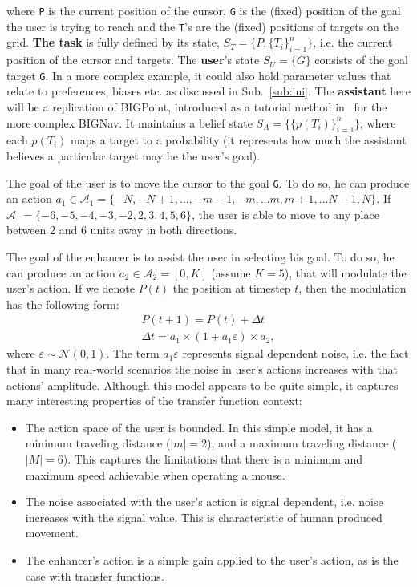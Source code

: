 \documentclass[12pt,a4paper]{article}
\begin{document}
\noindent where \texttt{P} is the current position of the cursor, \texttt{G} is the (fixed) position of the goal the user is trying to reach and the \texttt{T}'s are the (fixed) positions of targets on the grid.
\textbf{The task} is fully defined by its state, $S_T = \lbrace P, \lbrace T_i \rbrace_{i=1}^n \rbrace$, i.e. the current position of the cursor and targets. The \textbf{user}'s state $S_U = \lbrace G \rbrace$ consists of the goal target \texttt{G}. In a more complex example, it could also hold parameter values that relate to preferences, biases etc. as discussed in Sub.~\ref{sub:iui}. The \textbf{assistant} here will be a replication of BIGPoint, introduced as a tutorial method in~\cite{lui2017} for the more complex BIGNav. It maintains a belief state $S_A = \lbrace \lbrace p(T_i) \rbrace_{i=1}^n \rbrace$, where each $p(T_i)$ maps a target to a probability (it represents how much the assistant believes a particular target may be the user's goal).





The goal of the user is to move the cursor to the goal \texttt{G}. To do so, he can produce an action $a_1 \in \mathcal{A}_1 =  \lbrace -N, -N +1, \dots{}, -m -1, -m, \dots{} m, m+1, \dots{} N-1, N \rbrace$. If $\mathcal{A}_1 = \lbrace-6, -5, -4, -3, -2, 2, 3, 4, 5, 6 \rbrace$, the user is able to move to any place between 2 and 6 units away in both directions. 


The goal of the enhancer is to assist the user in selecting his goal. To do so, he can produce an action $a_2 \in \mathcal{A}_2 = [0,K]$ (assume $K=5$), that will modulate the user's action. If we denote $P(t)$ the position at timestep $t$, then the modulation has the following form:
\begin{align}
P(t+1) = P(t) + \Delta t \label{eq:toy_problem_model_1} \\
\Delta t =  a_1 \times (1 + a_1 \varepsilon) \times a_2, \label{eq:toy_problem_model_2}
\end{align}
\noindent where $\varepsilon \sim  \mathcal{N}(0,1)$. The term $a_1 \varepsilon$ represents signal dependent noise, i.e. the fact that in many real-world scenarios the noise in user's actions increases with that actions' amplitude.
Although this model appears to be quite simple, it captures many interesting properties of the transfer function context:

\begin{itemize}
\item The action space of the user is bounded. In this simple model, it has a minimum traveling distance ($|m|=2$), and a maximum traveling distance ($|M| = 6$). This captures the limitations that there is a minimum and maximum speed achievable when operating a mouse.
\item The noise associated with the user's action is signal dependent, i.e. noise increases with the signal value. This is characteristic of human produced movement.
\item The enhancer's action is a simple gain applied to the user's action, as is the case with transfer functions.
\end{itemize}
\end{document}
